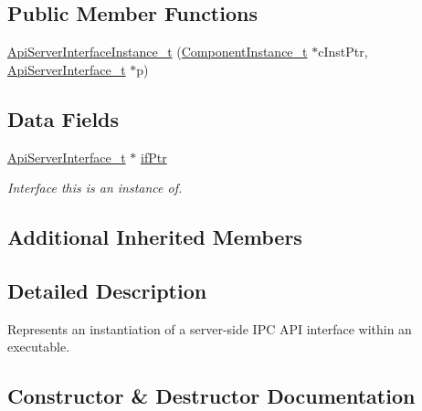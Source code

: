 \subsection*{Public Member Functions}
\begin{DoxyCompactItemize}
\item 
\hyperlink{structmodel_1_1_api_server_interface_instance__t_a4c7eaad472f72b1a37b23d96cdc931b9}{Api\+Server\+Interface\+Instance\+\_\+t} (\hyperlink{structmodel_1_1_component_instance__t}{Component\+Instance\+\_\+t} $\ast$c\+Inst\+Ptr, \hyperlink{structmodel_1_1_api_server_interface__t}{Api\+Server\+Interface\+\_\+t} $\ast$p)
\end{DoxyCompactItemize}
\subsection*{Data Fields}
\begin{DoxyCompactItemize}
\item 
\hyperlink{structmodel_1_1_api_server_interface__t}{Api\+Server\+Interface\+\_\+t} $\ast$ \hyperlink{structmodel_1_1_api_server_interface_instance__t_a3185b6523e4f8475758edba6024b9246}{if\+Ptr}
\begin{DoxyCompactList}\small\item\em Interface this is an instance of. \end{DoxyCompactList}\end{DoxyCompactItemize}
\subsection*{Additional Inherited Members}


\subsection{Detailed Description}
Represents an instantiation of a server-\/side I\+PC A\+PI interface within an executable. 

\subsection{Constructor \& Destructor Documentation}
